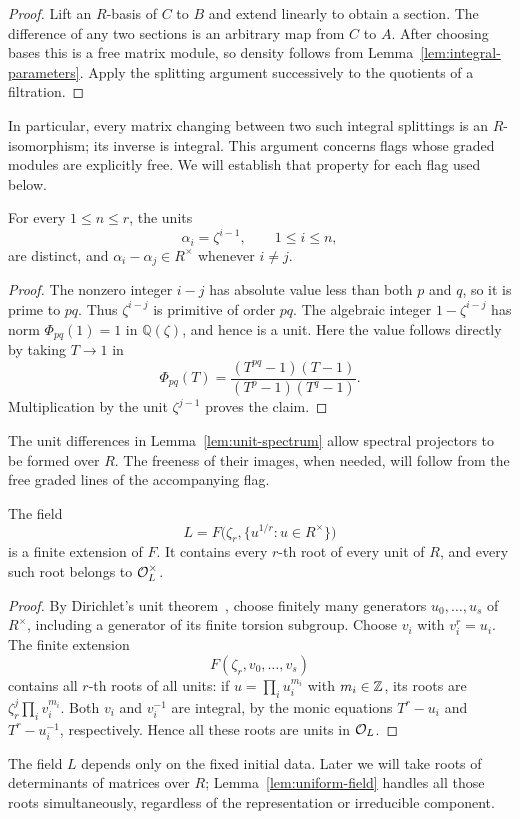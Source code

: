 \begin{proof}
Lift an $R$-basis of $C$ to $B$ and extend linearly to obtain a section.
The difference of any two sections is an arbitrary map from $C$ to $A$.
After choosing bases this is a free matrix module, so density follows
from Lemma~\ref{lem:integral-parameters}.  Apply the splitting argument
successively to the quotients of a filtration.
\end{proof}

In particular, every matrix changing between two such integral splittings
is an $R$-isomorphism; its inverse is integral.  This argument concerns
flags whose graded modules are explicitly free.  We will establish that
property for each flag used below.

\begin{lemma}\label{lem:unit-spectrum}
For every $1\leq n\leq r$, the units
\[
 \alpha_i=\zeta^{i-1},\qquad 1\leq i\leq n,
\]
are distinct, and $\alpha_i-\alpha_j\in R^\times$ whenever $i\ne j$.
\end{lemma}

\begin{proof}
The nonzero integer $i-j$ has absolute value less than both $p$ and $q$,
so it is prime to $pq$.  Thus $\zeta^{i-j}$ is primitive of order $pq$.
The algebraic integer $1-\zeta^{i-j}$ has norm
$\Phi_{pq}(1)=1$ in $\mathbb Q(\zeta)$, and hence is a unit.  Here the
value follows directly by taking $T\to1$ in
\[
 \Phi_{pq}(T)=
 \frac{(T^{pq}-1)(T-1)}{(T^p-1)(T^q-1)}.
\]
Multiplication by the unit $\zeta^{j-1}$ proves the claim.
\end{proof}

The unit differences in Lemma~\ref{lem:unit-spectrum} allow spectral
projectors to be formed over $R$.  The freeness of their images, when
needed, will follow from the free graded lines of the accompanying flag.

\begin{lemma}\label{lem:uniform-field}
The field
\[
 L=F\bigl(\zeta_r,\{u^{1/r}:u\in R^\times\}\bigr)
\]
is a finite extension of $F$.  It contains every $r$-th root of every
unit of $R$, and every such root belongs to $\mathcal O_L^\times$.
\end{lemma}

\begin{proof}
By Dirichlet's unit theorem~\cite[Theorem~5.1]{MilneANT}, choose finitely
many generators
$u_0,\ldots,u_s$ of $R^\times$, including a generator of its finite
torsion subgroup.  Choose $v_i$ with $v_i^r=u_i$.  The finite extension
\[
 F(\zeta_r,v_0,\ldots,v_s)
\]
contains all $r$-th roots of all units: if
$u=\prod_i u_i^{m_i}$ with $m_i\in\mathbb Z$, its roots are
$\zeta_r^j\prod_i v_i^{m_i}$.
Both $v_i$ and $v_i^{-1}$ are integral, by the monic equations
$T^r-u_i$ and $T^r-u_i^{-1}$, respectively.  Hence all these roots are
units in $\mathcal O_L$.
\end{proof}

The field $L$ depends only on the fixed initial data.  Later we will take
roots of determinants of matrices over $R$; Lemma~\ref{lem:uniform-field}
handles all those roots simultaneously, regardless of the representation
or irreducible component.
